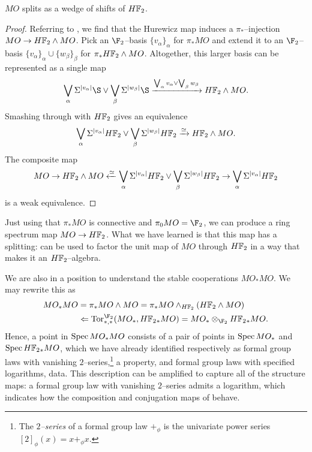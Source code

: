 \begin{lemma}\label{MOSplitsIntoHF2s}
\(MO\) splits as a wedge of shifts of \(\HFtwo\).
\end{lemma}
\begin{proof}
Referring to , we find that the Hurewicz map induces a \(\pi_*\)--injection \(MO \to \HFtwo \sm MO\).  Pick an \(\F_2\)--basis \(\{v_\alpha\}_\alpha\) for \(\pi_* MO\) and extend it to an \(\F_2\)--basis \(\{v_\alpha\}_\alpha \cup \{w_\beta\}_\beta\) for \(\pi_* \HFtwo \sm MO\).  Altogether, this larger basis can be represented as a single map \[\bigvee_\alpha \Susp^{|v_\alpha|} \S \vee \bigvee_\beta \Susp^{|w_\beta|} \S \xrightarrow{\bigvee_\alpha v_\alpha \vee \bigvee_\beta w_\beta} \HFtwo \sm MO.\]  Smashing through with \(\HFtwo\) gives an equivalence \[\bigvee_\alpha \Susp^{|v_\alpha|} \HFtwo \vee \bigvee_\beta \Susp^{|w_\beta|} \HFtwo \xrightarrow\simeq \HFtwo \sm MO.\]  The composite map \[MO \to \HFtwo \sm MO \xleftarrow\simeq \bigvee_\alpha \Susp^{|v_\alpha|} \HFtwo \vee \bigvee_\beta \Susp^{|w_\beta|} \HFtwo \to \bigvee_\alpha \Susp^{|v_\alpha|} \HFtwo\] is a weak equivalence.
\end{proof}

\begin{remark}
Just using that \(\pi_* MO\) is connective and \(\pi_0 MO = \F_2\), we can produce a ring spectrum map \(MO \to \HFtwo\).  What we have learned is that this map has a splitting:  can be used to factor the unit map of \(MO\) through \(\HFtwo\) in a way that makes it an \(\HFtwo\)--algebra.
\end{remark}

\begin{remark}
We are also in a position to understand the stable cooperations \(MO_* MO\).  We may rewrite this as
\begin{align*}
MO_* MO & = \pi_* MO \sm MO = \pi_* MO \sm_{\HFtwo} (\HFtwo \sm MO) \\
& \Leftarrow \Tor^{\F_2}_{*, *}(MO_*, \HFtwo_* MO) = MO_* \otimes_{\F_2} \HFtwo_* MO.
\end{align*}
Hence, a point in \(\operatorname{Spec} MO_* MO\) consists of a pair of points in \(\operatorname{Spec} MO_*\) and \(\Spec \HFtwo_* MO\), which we have already identified respectively as formal group laws with vanishing \(2\)--series,\footnote{The \textit{\(2\)--series} of a formal group law \(+_\phi\) is the univariate power series \([2]_\phi(x) = x +_\phi x\).} a property, and formal group laws with specified logarithms, data.  This description can be amplified to capture all of the structure maps: a formal group law with vanishing \(2\)--series admits a logarithm, which indicates how the composition and conjugation maps of  behave.
\end{remark}



